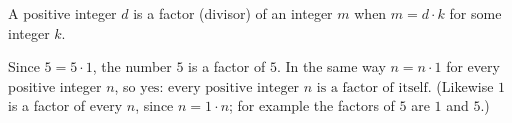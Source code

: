 A positive integer $d$ is a factor (divisor) of an integer $m$ when $m=d\cdot k$ for some integer $k$.

Since $5=5\cdot1$, the number $5$ is a factor of $5$. In the same way $n=n\cdot1$ for every positive integer $n$, so $\boxed{\text{yes: every positive integer }n\text{ is a factor of itself}}$. (Likewise $1$ is a factor of every $n$, since $n=1\cdot n$; for example the factors of $5$ are $1$ and $5$.)
